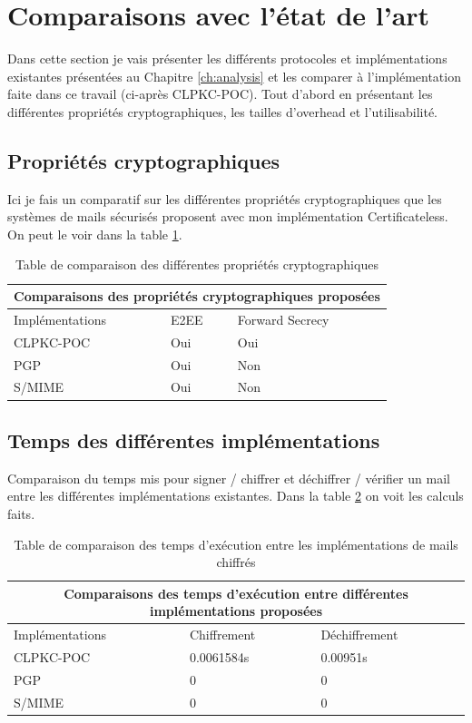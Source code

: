 \section{Comparaisons avec l'état de l'art}
Dans cette section je vais présenter les différents protocoles et implémentations existantes présentées au Chapitre \ref{ch:analysis} et les comparer à l'implémentation faite dans ce travail (ci-après CLPKC-POC). Tout d'abord en présentant les différentes propriétés cryptographiques, les tailles d'overhead et l'utilisabilité.

\subsection{Propriétés cryptographiques}
Ici je fais un comparatif sur les différentes propriétés cryptographiques que les systèmes de mails sécurisés proposent avec mon implémentation Certificateless. On peut le voir dans la table \ref{table:comparisonProperties}.
\begin{table}[h!]
	\centering
	\begin{tabular}{ |p{3cm}||p{3cm}|p{3cm}| }
		\hline
		\multicolumn{3}{|c|}{Comparaisons des propriétés cryptographiques proposées} \\
		\hline
		Implémentations & E2EE & Forward Secrecy\\
		\hline
		CLPKC-POC   & Oui & Oui\\
		PGP & Oui & Non\\
		S/MIME & Oui & Non\\
		\hline
	\end{tabular}
	\caption{Table de comparaison des différentes propriétés cryptographiques }
	\label{table:comparisonProperties}
\end{table}
\subsection{Temps des différentes implémentations}
Comparaison du temps mis pour signer / chiffrer et déchiffrer / vérifier un mail entre les différentes implémentations existantes. Dans la table \ref{table:comparisonTime} on voit les calculs faits.
\begin{table}[h!]
	\centering
	\begin{tabular}{ |p{3cm}||p{3cm}|p{3cm}| }
		\hline
		\multicolumn{3}{|c|}{Comparaisons des temps d'exécution entre différentes implémentations proposées} \\
		\hline
		Implémentations & Chiffrement & Déchiffrement\\
		\hline
		CLPKC-POC   & 0.0061584s & 0.00951s\\
		PGP & 0 & 0\\
		S/MIME & 0 & 0\\
		\hline
	\end{tabular}
	\caption{Table de comparaison des temps d'exécution entre les implémentations de mails chiffrés}
	\label{table:comparisonTime}
\end{table}
